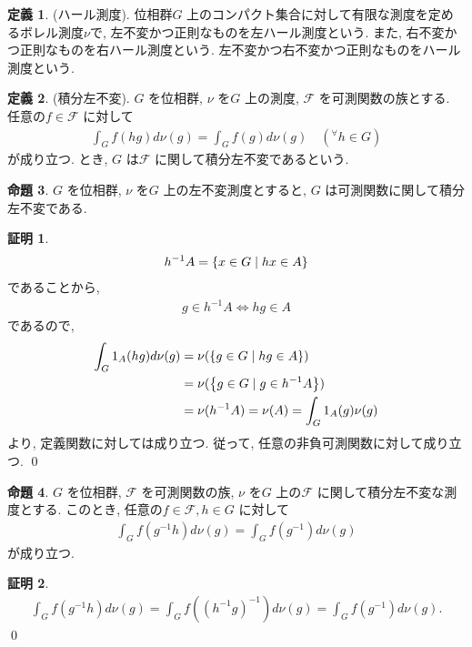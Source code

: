 \documentclass[10pt, fleqn, label-section=none]{bxjsarticle}
\theoremstyle{definition}
\newtheorem{dfn}{定義}[section]
\newtheorem{prop}[dfn]{命題}
\newtheorem*{pf*}{証明}
\newcommand{\any}{{}^{\forall}}
\newcommand{\cbra}[1]{\mleft\{#1\mright\}}
\newcommand{\LR}{\Leftrightarrow}
\renewcommand{\;}{\, ; \,}
\begin{document}
\begin{dfn}(ハール測度). 位相群$G$ 上のコンパクト集合に対して有限な測度を定めるボレル測度$\nu$で, 左不変かつ正則なものを左ハール測度という. また, 右不変かつ正則なものを右ハール測度という. 左不変かつ右不変かつ正則なものをハール測度という.

\end{dfn}

\begin{dfn}(積分左不変). $G$ を位相群, $\nu$ を$G$ 上の測度, $\mathcal F$ を可測関数の族とする. 任意の$f \in \mathcal F$ に対して
\begin{align*} \int_G f (hg) d \nu(g) = \int_G f (g) d\nu(g) \quad (\any h \in G)\end{align*}
が成り立つ. とき, $G$ は$\mathcal F$ に関して積分左不変であるという.
\end{dfn}



\begin{prop} $G$ を位相群, $\nu$ を$G$ 上の左不変測度とすると, $G$ は可測関数に関して積分左不変である.
\end{prop}
\begin{pf*}
\begin{align*} h^{-1} A = \cbra{x \in G \mid hx \in A} \end{align*}
であることから, 
\begin{align*} g \in h^{-1}A  \LR hg \in A \end{align*}
であるので, 
\begin{align*} \int_G 1_A (hg) d\nu(g) &= \nu(\cbra{g \in G \mid hg \in A}) \\ 
&= \nu(\cbra{g \in G \mid g \in h^{-1}A }) \\
&= \nu(h^{-1}A) = \nu (A) = \int_G 1_A (g) \nu(g) 
\end{align*}
より, 定義関数に対しては成り立つ. 従って, 任意の非負可測関数に対して成り立つ.
\qed
\end{pf*}

\begin{prop} $G$ を位相群, $\mathcal F$ を可測関数の族, $\nu$ を$G$ 上の$\mathcal F$ に関して積分左不変な測度とする. このとき, 任意の$f \in \mathcal F, h \in G$ に対して
\begin{align*} \int_G f(g^{-1} h)d\nu(g) = \int_{G} f(g^{-1}) d\nu(g)  \end{align*}
が成り立つ. 
\end{prop}
\begin{pf*}
\begin{align*} \int_G f(g^{-1} h)d\nu(g) =\int_G f((h^{-1} g)^{-1} ) d\nu(g) = \int_{G} f(g^{-1}) d\nu(g).  \end{align*}
\qed
\end{pf*}
\end{document}
